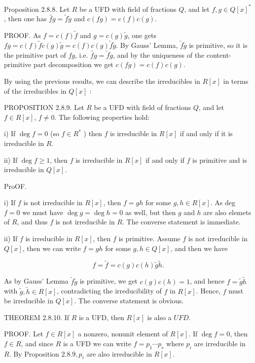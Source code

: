 Proposition 2.8.8. Let $R$ be a UFD with field of fractions $Q$, and let $f, g \in Q[x]^{*}$, then one has $\widetilde{f g}=\tilde{f} \tilde{g}$ and $c(f g)=c(f) c(g)$.

PROOF. As $f=c(f) \tilde{f}$ and $g=c(g) \tilde{g}$, one gets $f g=c(f) \tilde{f} c(g) \tilde{g}=c(f) c(g) \tilde{f} \tilde{g}$. By Gauss' Lemma, $\tilde{f} \tilde{g}$ is primitive, so it is the primitive part of $f g$, i.e. $\widetilde{f g}=\tilde{f} \tilde{g}$, and by the uniqueness of the content-primitive part decomposition we get $c(f g)=c(f) c(g)$.

By using the previous results, we can describe the irreducibles in $R[x]$ in terms of the irreducibles in $Q[x]$ :

PROPOSITION 2.8.9. Let $R$ be a UFD with field of fractions $Q$, and let $f \in R[x]$, $f \neq 0$. The following properties hold:

i) If $\operatorname{deg} f=0$ (so $f \in R^{*}$ ) then $f$ is irreducible in $R[x]$ if and only if it is irreducible in $R$.

ii) If $\operatorname{deg} f \geq 1$, then $f$ is irreducible in $R[x]$ if and only if $f$ is primitive and is irreducible in $Q[x]$.

ProOF.

i) If $f$ is not irreducible in $R[x]$, then $f=g h$ for some $g, h \in R[x]$. As deg $f=0$ we must have $\operatorname{deg} g=\operatorname{deg} h=0$ as well, but then $g$ and $h$ are also elemets of $R$, and thus $f$ is not irreducible in $R$. The converse statement is immediate.

ii) If $f$ is irreducible in $R[x]$, then $f$ is primitive. Assume $f$ is not irreducible in $Q[x]$, then we can write $f=g h$ for some $g, h \in Q[x]$, and then we have

$$
f=\tilde{f}=c(g) c(h) \tilde{g} \tilde{h} .
$$

As by Gauss' Lemma $\tilde{f} \tilde{g}$ is primitive, we get $c(g) c(h)=1$, and hence $f=\tilde{g} \tilde{h}$ with $\tilde{g}, \tilde{h} \in R[x]$, contradicting the irreducibility of $f$ in $R[x]$. Hence, $f$ must be irreducible in $Q[x]$. The converse statement is obvious.

THEOREM 2.8.10. If $R$ is a UFD, then $R[x]$ is also a $U F D$.

PROOF. Let $f \in R[x]$ a nonzero, nonunit element of $R[x]$. If $\operatorname{deg} f=0$, then $f \in R$, and since $R$ is a UFD we can write $f=p_{1} \cdots p_{s}$ where $p_{i}$ are irreducible in $R$. By Proposition $2.8 .9, p_{i}$ are also irreducible in $R[x]$.


